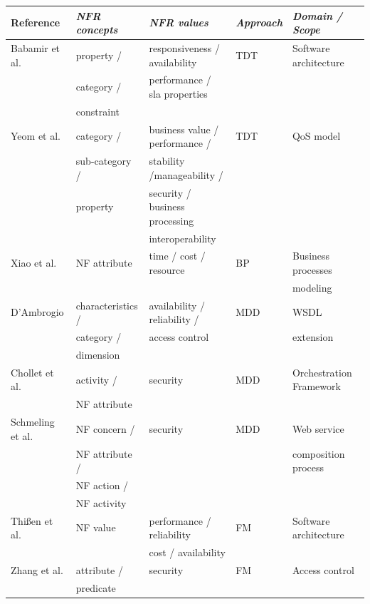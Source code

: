 \documentclass{sig-alternate}
\begin{document}
  
\begin{table}[ht!]
\centering
\tiny
\begin{tabular}{l|l|l|l|l}
  \hline 
  \hline
   \textbf{Reference} & \textbf{\textit{NFR concepts}} &
   \textbf{\textit{NFR values}} & \textbf{\textit{Approach}} &
   \textbf{\textit{Domain / Scope}} 
   \\
  \hline
  \hline  
  Babamir et al. \cite{Babamir2010} &  property / & responsiveness /
  availability   & TDT & Software architecture
 \\  
  & category /  & performance / sla properties   &  & 
 \\
 &  constraint &    &  & 
 \\ 
  \hline   
 
  Yeom et al. \cite{Yeom2006} & category / & business value / performance /
   & TDT & QoS model\\ 
   & sub-category / & stability /manageability /   & & \\
   & property & security / business processing  & & \\
    &  & interoperability & & \\ 
  \hline 
  
  Xiao et al. \cite{XiaoCZBOLH08} &  NF attribute  & time /
cost / resource  & BP  & Business processes
   \\
 	&   &   &  & modeling
   \\   
  \hline 
  D'Ambrogio \cite{DAmbrogio06} &  characteristics /  & availability /
  reliability / & MDD & WSDL \\ &  category /  &  access control  &  &
  extension
  \\
  &  dimension &    &  & 
 \\
   \hline
  Chollet et al. \cite{CholletL09} & activity / & security  & MDD 
  & Orchestration Framework
   \\
  &  NF attribute &    &  & 
  \\
  
  \hline
  Schmeling et al. \cite{SchmelingCM11} & NF concern / & security &
  MDD &  Web service 
  \\
  & NF attribute / &  &
   & composition process
    \\
  &  NF action / &    &  &
   \\
  &  NF activity	 &    &  &
  \\ 
  \hline
    Thi{\ss}en et al. \cite{ThissenW06} & NF value  &  performance /
  reliability &  FM & Software architecture \\  
   & & cost / availability &  & \\  
  \hline
  Zhang et al. \cite{ZhangPSP05} & attribute /& security & FM &  Access control 
   \\
  &  predicate &    &  &
  \\
  

\end{tabular}
\end{table}
\end{document}
